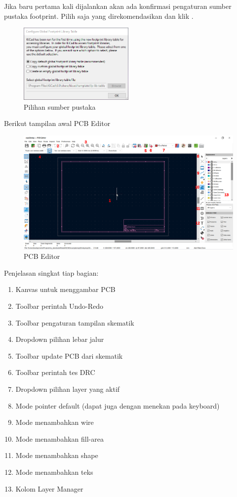 \documentclass[12pt]{book}
\begin{document}
	Jika baru pertama kali dijalankan akan ada konfirmasi pengaturan sumber pustaka footprint.
	Pilih saja yang direkomendasikan dan klik .

	\begin{figure}[!ht]
		\centering
		\includegraphics[width=0.5\textwidth]{images/installations/kicad_first_pcb}
		\caption{Pilihan sumber pustaka}
	\end{figure}

	\newpage
	Berikut tampilan awal PCB Editor
	\begin{figure}[!ht]
		\centering
		\includegraphics[width=\textwidth]{images/pcb/pcb_1}
		\caption{PCB Editor}
	\end{figure}

	Penjelasan singkat tiap bagian:
	\begin{enumerate}[label=\textbf{\arabic*}.]
		\item Kanvas untuk menggambar PCB
		\item Toolbar perintah Undo-Redo
		\item Toolbar pengaturan tampilan skematik
		\item Dropdown pilihan lebar jalur
		\item Toolbar update PCB dari skematik
		\item Toolbar perintah tes DRC
		\item Dropdown pilihan layer yang aktif
		\item Mode pointer default (dapat juga dengan menekan  pada keyboard)
		\item Mode menambahkan wire
		\item Mode menambahkan fill-area
		\item Mode menambahkan shape
		\item Mode menambahkan teks
		\item Kolom Layer Manager
	\end{enumerate}
\end{document}

